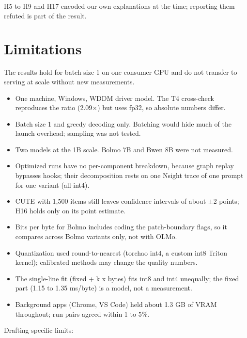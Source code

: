 \documentclass[11pt,a4paper]{article}
\newcommand{\x}{\ensuremath{\times}}
\begin{document}
H5 to H9 and H17 encoded our own explanations at the time; reporting them refuted is part of the result.

\section{Limitations}\label{limitations}

The results hold for batch size 1 on one consumer GPU and do not transfer to serving at scale without new measurements.

\begin{itemize}
\item
  One machine, Windows, WDDM driver model. The T4 cross-check reproduces the ratio (2.09\x{}) but uses fp32, so absolute numbers differ.
\item
  Batch size 1 and greedy decoding only. Batching would hide much of the launch overhead; sampling was not tested.
\item
  Two models at the 1B scale. Bolmo 7B and Bwen 8B were not measured.
\item
  Optimized runs have no per-component breakdown, because graph replay bypasses hooks; their decomposition rests on one Nsight trace of one prompt for one variant (all-int4).
\item
  CUTE with 1,500 items still leaves confidence intervals of about $\pm$2 points; H16 holds only on its point estimate.
\item
  Bits per byte for Bolmo includes coding the patch-boundary flags, so it compares across Bolmo variants only, not with OLMo.
\item
  Quantization used round-to-nearest (torchao int4, a custom int8 Triton kernel); calibrated methods may change the quality numbers.
\item
  The single-line fit (fixed + k x bytes) fits int8 and int4 unequally; the fixed part (1.15 to 1.35 ms/byte) is a model, not a measurement.
\item
  Background apps (Chrome, VS Code) held about 1.3 GB of VRAM throughout; run pairs agreed within 1 to 5\%.
\end{itemize}

Drafting-specific limits:
\end{document}
